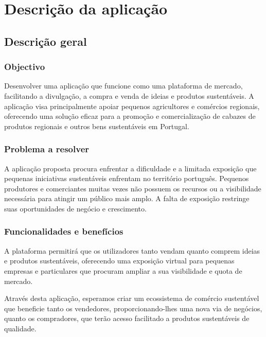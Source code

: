 \section{Descrição da aplicação} \label{section: descricao}

\subsection{Descrição geral}

\subsubsection{Objectivo}
Desenvolver uma aplicação que funcione como uma plataforma de mercado, facilitando a divulgação, a compra e venda de ideias e produtos sustentáveis. 
A aplicação visa principalmente apoiar pequenos agricultores e comércios regionais, oferecendo uma solução eficaz para a promoção e comercialização de cabazes de produtos regionais e outros bens sustentáveis em Portugal.

\subsubsection{Problema a resolver}
A aplicação proposta procura enfrentar a dificuldade e a limitada exposição que pequenas iniciativas sustentáveis enfrentam no território português. 
Pequenos produtores e comerciantes muitas vezes não possuem os recursos ou a visibilidade necessária para atingir um público mais amplo. A falta de exposição restringe suas oportunidades de negócio e crescimento.

\subsubsection{Funcionalidades e benefícios}
A plataforma permitirá que os utilizadores tanto vendam quanto comprem ideias e produtos sustentáveis, oferecendo uma exposição virtual para pequenas empresas e particulares que procuram ampliar a sua visibilidade e quota de mercado. 
\par \vspace{6pt}
Através desta aplicação, esperamos criar um ecossistema de comércio sustentável que beneficie tanto os vendedores, proporcionando-lhes uma nova via de negócios, quanto os compradores, que terão acesso facilitado a produtos sustentáveis de qualidade.

